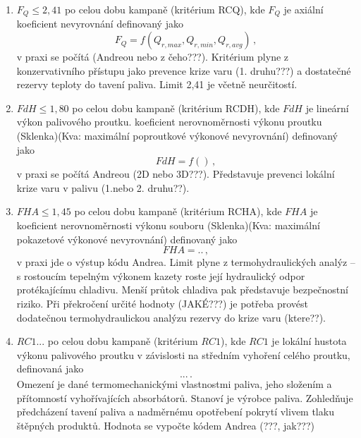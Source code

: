 \begin{enumerate}
	\item $F_Q \leq 2,41$ po celou dobu kampaně (kritérium RCQ), kde $F_Q$ je axiální koeficient nevyrovnání definovaný jako 
		\begin{equation}
			F_Q = f(Q_{r,max}, Q_{r,min}, Q_{r,avg})\,,
		\end{equation}
		v praxi se počítá (Andreou nebo z čeho???).%
		Kritérium plyne z konzervativního přístupu jako prevence krize varu (1. druhu???) a dostatečné rezervy teploty do tavení paliva. 
		Limit 2,41 je včetně neurčitostí.
	
	\item $FdH \leq 1,80$ po celou dobu kampaně (kritérium RCDH), kde $FdH$ je lineární výkon palivového proutku. koeficient nerovnoměrnosti výkonu proutku (Sklenka)(Kva: maximální poproutkové 
		výkonové nevyrovnání) definovaný jako 
		\begin{equation}
			FdH = f()\,,
		\end{equation}
		v praxi se počítá Andreou (2D nebo 3D???).%
		Představuje prevenci lokální krize varu v palivu (1.nebo 2. druhu??).%

	\item $FHA \leq 1,45$ po celou dobu kampaně (kritérium RCHA), kde $FHA$ je koeficient nerovnoměrnosti výkonu souboru (Sklenka)(Kva: maximální pokazetové 
		výkonové nevyrovnání) definovaný jako
		\begin{equation}
			FHA = ..\,,
		\end{equation}
		v praxi jde o výstup kódu Andrea. Limit plyne z termohydraulických analýz -- s rostoucím tepelným výkonem kazety roste její hydraulický odpor 
		protékajícímu 
		chladivu. Menší průtok chladiva pak představuje bezpečnostní riziko. Při překročení určité hodnoty (JAKÉ???)%
		je potřeba provést dodatečnou termohydraulickou analýzu rezervy do krize varu (ktere??).%

	\item $RC1 ...$ po celou dobu kampaně (kritérium $RC1$), kde $RC1$ je lokální hustota výkonu palivového proutku v závislosti na středním vyhoření 
		celého proutku, definovaná jako
		\begin{equation}
			...\,.
		\end{equation}
		Omezení je dané termomechanickými vlastnostmi paliva, jeho složením a přítomností vyhořívajících absorbátorů. Stanoví je výrobce 
		paliva. Zohledňuje předcházení tavení paliva a nadměrnému opotřebení pokrytí vlivem tlaku štěpných produktů. Hodnota se vypočte kódem Andrea (???, 
		jak???)%


\end{enumerate}
